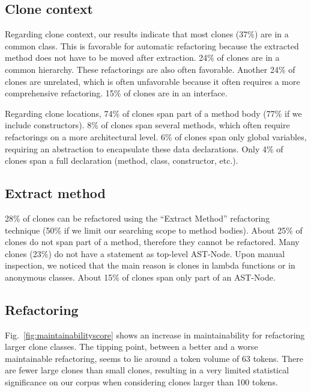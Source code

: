 \documentclass[sigconf,review,anonymous]{acmart}
\begin{document}

\subsection{Clone context}
Regarding clone context, our results indicate that most clones (37\%) are in a common class. This is favorable for automatic refactoring because the extracted method does not have to be moved after extraction. 24\% of clones are in a common hierarchy. These refactorings are also often favorable. Another 24\% of clones are unrelated, which is often unfavorable because it often requires a more comprehensive refactoring. 15\% of clones are in an interface. %

Regarding clone locations, 74\% of clones span part of a method body (77\% if we include constructors). 8\% of clones span several methods, which often require refactorings on a more architectural level. 6\% of clones span only global variables, requiring an abstraction to encapsulate these data declarations. Only 4\% of clones span a full declaration (method, class, constructor, etc.).

\subsection{Extract method}
28\% of clones can be refactored using the ``Extract Method'' refactoring technique (50\% if we limit our searching scope to method bodies). About 25\% of clones do not span part of a method, therefore they cannot be refactored. Many clones (23\%) do not have a statement as top-level AST-Node. Upon manual inspection, we noticed that the main reason is clones in lambda functions or in anonymous classes. About 15\% of clones span only part of an AST-Node.%

\subsection{Refactoring}
Fig.~\ref{fig:maintainabilityscore} shows an increase in maintainability for refactoring larger clone classes. The tipping point, between a better and a worse maintainable refactoring, seems to lie around a token volume of 63 tokens. There are fewer large clones than small clones, resulting in a very limited %
statistical significance on our corpus when considering clones larger than 100 tokens.
\end{document}
